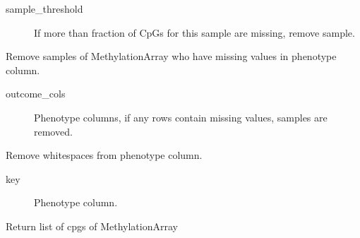 \documentclass[letterpaper,10pt,english]{sphinxmanual}
\begin{document}
\begin{fulllineitems}
\begin{fulllineitems}
\begin{description}
\item[{sample\_threshold}] \leavevmode
If more than fraction of CpGs for this sample are missing, remove sample.

\end{description}

\end{fulllineitems}


\begin{fulllineitems}
\label{\detokenize{index:pymethylprocess.MethylationDataTypes.MethylationArray.remove_na_samples}}
Remove samples of MethylationArray who have missing values in phenotype column.
\begin{description}
\item[{outcome\_cols}] \leavevmode
Phenotype columns, if any rows contain missing values, samples are removed.

\end{description}

\end{fulllineitems}


\begin{fulllineitems}
\label{\detokenize{index:pymethylprocess.MethylationDataTypes.MethylationArray.remove_whitespace}}
Remove whitespaces from phenotype column.
\begin{description}
\item[{key}] \leavevmode
Phenotype column.

\end{description}

\end{fulllineitems}


\begin{fulllineitems}
\label{\detokenize{index:pymethylprocess.MethylationDataTypes.MethylationArray.return_cpgs}}
Return list of cpgs of MethylationArray


\end{fulllineitems}
\end{fulllineitems}
\end{document}

